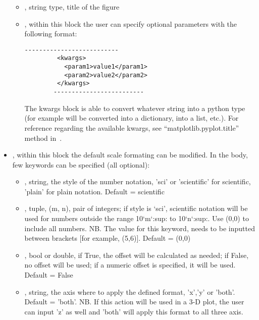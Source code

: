 \begin{itemize}
 \begin{itemize}
    \item \textit{}, string type, title of the figure
    \item \textit{}, within this block the user can specify optional
    parameters with the following format:
        \begin{lstlisting}[style=XML]
        --------------------------
         <kwargs>
           <param1>value1</param1>
           <param2>value2</param2>
         </kwargs>
        -------------------------
       \end{lstlisting}
    The kwargs block is able to convert whatever string into a python type (for
    example  will be converted into a
    dictionary,  into a list, etc.).
    For reference regarding the available kwargs, see
    ``matplotlib.pyplot.title'' method in~\cite{MatPlotLib}.
      \end{itemize}
  \item {}, within this block the default scale formating can be
  modified.
  In the body, few keywords can be specified (all optional):
 \begin{itemize}
    \item \textit{}, string, the style of the number notation, 'sci' or
    'scientific' for scientific, 'plain' for plain notation.
    Default = scientific
    \item \textit{}, tuple, (m, n), pair of integers; if style is
    ‘sci’, scientific notation will be used for numbers outside the range
    10`m`:sup: to 10`n`:sup:.
    Use (0,0) to include all numbers.
    NB.
    The value for this keyword, needs to be inputted between brackets [for
    example, (5,6)].
    Default = (0,0)
    \item \textit{}, bool or double, if True, the offset will be
    calculated as needed; if False, no offset will be used; if a numeric offset
    is specified, it will be used.
    Default = False
    \item \textit{}, string, the axis where to apply the defined format,
    'x','y' or 'both'.
    Default = 'both'.
    NB.
    If this action will be used in a 3-D plot, the user can input 'z' as well
    and 'both' will apply this format to all three axis.
      \end{itemize}

\end{itemize}
